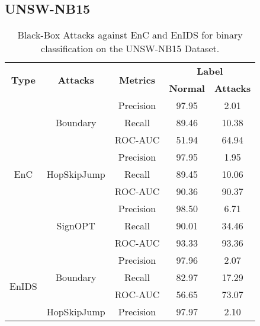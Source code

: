 \documentclass[conference]{IEEEtran}
\begin{document}
	
	
	
	\subsection{UNSW-NB15}
	
	\begin{table}[H]
		\caption{Black-Box Attacks against EnC and EnIDS for binary classification on the UNSW-NB15 Dataset.}
		\small
		\setlength{\tabcolsep}{1pt}
		\centering
		\label{tab:unsw_bin_black}
		
		\begin{tabular}{|c|c|c|c|c|}
			\hline
			\multirow{2}{*}{\textbf{Type}} & \multirow{2}{*}{\textbf{Attacks}} & \multirow{2}{*}{\textbf{Metrics}} &  \multicolumn{2}{c|}{\textbf{Label}} \\
			\cline{4-5}
			&  &  & \textbf{Normal} & \textbf{Attacks} \\
			\hline
			\multirow{9}{*}{EnC} & 	\multirow{3}{*}{Boundary} & Precision & 97.95 & 2.01
			\\
			
			&  & Recall & 89.46 & 10.38
			\\
			
			&  & ROC-AUC & 51.94 & 64.94
			\\
			\cline{2-5}
			& \multirow{3}{*}{HopSkipJump} & Precision & 97.95 & 1.95
			\\
			
			&  & Recall & 89.45 & 10.06
			\\
			
			&  & ROC-AUC & 90.36 & 90.37
			\\
			\cline{2-5}
			& \multirow{3}{*}{SignOPT} & Precision & 98.50 & 6.71
			\\
			
			&  & Recall & 90.01 & 34.46
			\\
			
			&  & ROC-AUC & 93.33 & 93.36
			\\
			\hline
			\multirow{9}{*}{EnIDS}  & \multirow{3}{*}{Boundary} & Precision & 97.96 & 2.07
			\\
			
			&  & Recall & 82.97 & 17.29
			\\
			
			&  & ROC-AUC & \cellcolor{yellow!50}56.65 & \cellcolor{yellow!50}73.07
			\\
			\cline{2-5}
			& \multirow{3}{*}{HopSkipJump} & Precision & 97.97 & 2.10
			\\
			

\end{tabular}
\end{table}
\end{document}
